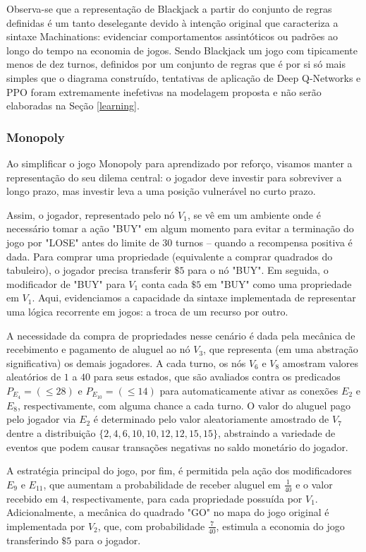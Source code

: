 \documentclass[conference]{IEEEtran}
\begin{document}
Observa-se que a representação de Blackjack a partir do conjunto de regras definidas é um tanto deselegante devido à intenção original que caracteriza a sintaxe Machinations: evidenciar comportamentos assintóticos ou padrões ao longo do tempo na economia de jogos. Sendo Blackjack um jogo com tipicamente menos de dez turnos, definidos por um conjunto de regras que é por si só mais simples que o diagrama construído, tentativas de aplicação de Deep Q-Networks e PPO foram extremamente inefetivas na modelagem proposta e não serão elaboradas na Seção \ref{learning}.


\subsubsection{Monopoly}
Ao simplificar o jogo Monopoly para aprendizado por reforço, visamos manter a representação do seu dilema central: o jogador deve investir para sobreviver a longo prazo, mas investir leva a uma posição vulnerável no curto prazo.

Assim, o jogador, representado pelo nó $V_1$, se vê em um ambiente onde é necessário tomar a ação "BUY" em algum momento para evitar a terminação do jogo por "LOSE" antes do limite de 30 turnos -- quando a recompensa positiva é dada. Para comprar uma propriedade (equivalente a comprar quadrados do tabuleiro), o jogador precisa transferir $\$5$ para o nó "BUY". Em seguida, o modificador de "BUY" para $V_1$ conta cada $\$5$ em "BUY" como uma propriedade em $V_1$. Aqui, evidenciamos a capacidade da sintaxe implementada de representar uma lógica recorrente em jogos: a troca de um recurso por outro.

A necessidade da compra de propriedades nesse cenário é dada pela mecânica de recebimento e pagamento de aluguel ao nó $V_3$, que representa (em uma abstração significativa) os demais jogadores. A cada turno, os nós $V_6$ e $V_8$ amostram valores aleatórios de $1$ a $40$ para seus estados, que são avaliados contra os predicados $P_{E_4} = (\leq 28)$ e $P_{E_{10}} = (\leq 14)$ para automaticamente ativar as conexões $E_2$ e $E_8$, respectivamente, com alguma chance a cada turno. O valor do aluguel pago pelo jogador via $E_2$ é determinado pelo valor aleatoriamente amostrado de $V_7$ dentre a distribuição $\{2, 4, 6, 10, 10, 12, 12, 15, 15\}$, abstraindo a variedade de eventos que podem causar transações negativas no saldo monetário do jogador.

A estratégia principal do jogo, por fim, é permitida pela ação dos modificadores $E_9$ e $E_{11}$, que aumentam a probabilidade de receber aluguel em $\frac{1}{40}$ e o valor recebido em $4$, respectivamente, para cada propriedade possuída por $V_1$. Adicionalmente, a mecânica do quadrado "GO" no mapa do jogo original é implementada por $V_2$, que, com probabilidade $\frac{7}{40}$, estimula a economia do jogo transferindo $\$5$ para o jogador.
\end{document}
